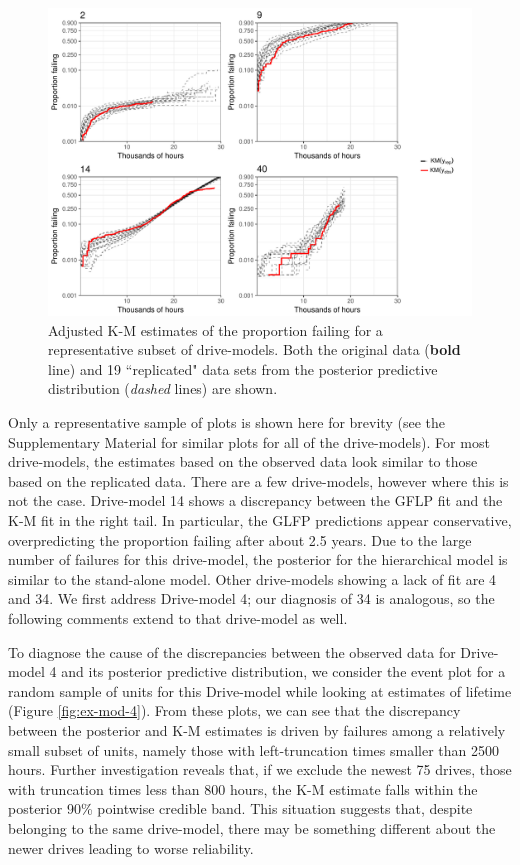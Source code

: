 \documentclass[12pt]{article}
\begin{document}
\begin{figure}[H]
\includegraphics[width=\textwidth]{ppcheck-sample}
\caption{Adjusted K-M estimates of the proportion failing for a representative subset of drive-models. Both the original data (\textbf{bold} line) and 19 ``replicated" data sets from the posterior predictive distribution (\textit{dashed} lines) are shown.}
\label{fig:post-pred-KM}
\end{figure}

Only a representative sample of plots is shown here for brevity (see the Supplementary Material for similar plots for all of the drive-models).  For most drive-models, the estimates based on the observed data look similar to those based on the replicated data.  There are a few drive-models, however where this is not the case. Drive-model 14 shows a discrepancy between the GFLP fit and the K-M fit in the right tail. In particular, the GLFP predictions appear conservative, overpredicting the proportion failing after about 2.5 years. Due to the large number of failures for this drive-model, the posterior for the hierarchical model is similar to the stand-alone model. Other drive-models showing a lack of fit are 4 and 34. We first address Drive-model 4; our diagnosis of 34 is analogous, so the following comments extend to that drive-model as well.


To diagnose the cause of the discrepancies between the observed data for Drive-model 4 and its posterior predictive distribution, we consider the event plot for a random sample of units for this Drive-model while looking at estimates of lifetime (Figure \ref{fig:ex-mod-4}). From these plots, we can see that the discrepancy between the posterior and K-M estimates is driven by failures among a relatively small subset of units, namely those with left-truncation times smaller than 2500 hours. Further investigation reveals that, if we exclude the newest 75 drives, those with truncation times less than 800 hours, the K-M estimate falls within the posterior 90\% pointwise credible band. This situation suggests that, despite belonging to the same drive-model, there may be something different about the newer drives leading to worse reliability. 
\end{document}
